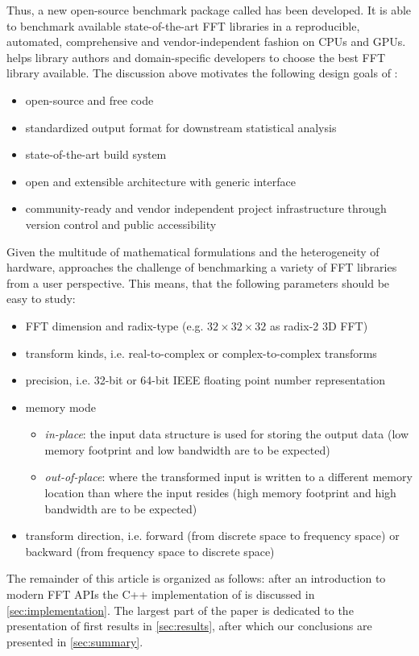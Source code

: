 Thus, a new open-source benchmark package called \gearshifft{} \citep{gearshifft_github} has been developed. It is able to benchmark available state-of-the-art FFT libraries in a reproducible, automated, comprehensive and vendor-independent fashion on CPUs and GPUs.
\gearshifft{} helps library authors and domain-specific developers to choose the best FFT library available. The discussion above motivates the following design goals of \gearshifft{}:
%
\begin{itemize}
\item open-source and free code
\item standardized output format for downstream statistical analysis
\item state-of-the-art build system
\item open and extensible architecture with generic interface
\item community-ready and vendor independent project infrastructure through version control and public accessibility
\end{itemize}
%
Given the multitude of mathematical formulations and the heterogeneity of hardware, \gearshifft{} approaches the challenge of benchmarking a variety of FFT libraries from a user perspective. This means, that the following parameters should be easy to study:
%
\begin{itemize}
\item FFT dimension and radix-type (e.g. $32{\times}32{\times}32$ as radix-2 3D FFT)
\item transform kinds, i.e. real-to-complex or complex-to-complex transforms
\item precision, i.e. 32-bit or 64-bit IEEE floating point number representation
\item memory mode
  \begin{itemize}
  \item \emph{in-place}: the input data structure is used for storing the output data (low memory footprint and low bandwidth are to be expected)
  \item \emph{out-of-place}:  where the transformed input is written to a different memory location than where the input resides (high memory footprint and high bandwidth are to be expected)
  \end{itemize}
\item transform direction, i.e. forward (from discrete space to frequency space) or backward (from frequency space to discrete space)
\end{itemize}
%
The remainder of this article is organized as follows: after an introduction to modern FFT APIs the C++ implementation of \gearshifft{} is discussed in \cref{sec:implementation}. The largest part of the paper is dedicated to the presentation of first results in \cref{sec:results}, after which our conclusions are presented in \cref{sec:summary}.

